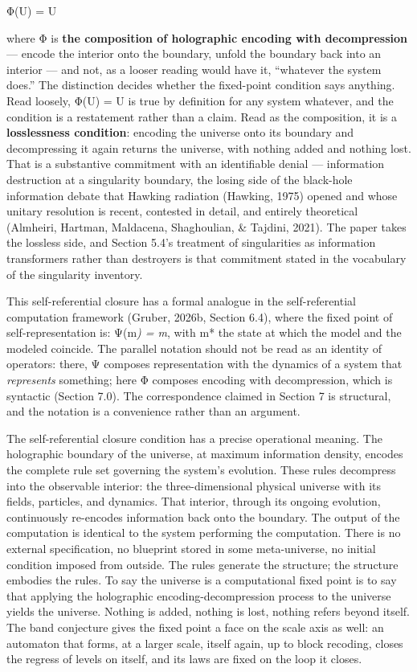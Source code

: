 \documentclass[
]{article}
\begin{document}
Φ(U) = U

where Φ is \textbf{the composition of holographic encoding with
decompression} --- encode the interior onto the boundary, unfold the
boundary back into an interior --- and not, as a looser reading would
have it, ``whatever the system does.'' The distinction decides whether
the fixed-point condition says anything. Read loosely, Φ(U) = U is true
by definition for any system whatever, and the condition is a
restatement rather than a claim. Read as the composition, it is a
\textbf{losslessness condition}: encoding the universe onto its boundary
and decompressing it again returns the universe, with nothing added and
nothing lost. That is a substantive commitment with an identifiable
denial --- information destruction at a singularity boundary, the losing
side of the black-hole information debate that Hawking radiation
(Hawking, 1975) opened and whose unitary resolution is recent, contested
in detail, and entirely theoretical (Almheiri, Hartman, Maldacena,
Shaghoulian, \& Tajdini, 2021). The paper takes the lossless side, and
Section 5.4's treatment of singularities as information transformers
rather than destroyers is that commitment stated in the vocabulary of
the singularity inventory.

This self-referential closure has a formal analogue in the
self-referential computation framework (Gruber, 2026b, Section 6.4),
where the fixed point of self-representation is: Ψ(m\emph{) = m}, with
m* the state at which the model and the modeled coincide. The parallel
notation should not be read as an identity of operators: there, Ψ
composes representation with the dynamics of a system that
\emph{represents} something; here Φ composes encoding with
decompression, which is syntactic (Section 7.0). The correspondence
claimed in Section 7 is structural, and the notation is a convenience
rather than an argument.

The self-referential closure condition has a precise operational
meaning. The holographic boundary of the universe, at maximum
information density, encodes the complete rule set governing the
system's evolution. These rules decompress into the observable interior:
the three-dimensional physical universe with its fields, particles, and
dynamics. That interior, through its ongoing evolution, continuously
re-encodes information back onto the boundary. The output of the
computation is identical to the system performing the computation. There
is no external specification, no blueprint stored in some meta-universe,
no initial condition imposed from outside. The rules generate the
structure; the structure embodies the rules. To say the universe is a
computational fixed point is to say that applying the holographic
encoding-decompression process to the universe yields the universe.
Nothing is added, nothing is lost, nothing refers beyond itself. The
band conjecture gives the fixed point a face on the scale axis as well:
an automaton that forms, at a larger scale, itself again, up to block
recoding, closes the regress of levels on itself, and its laws are fixed
on the loop it closes.
\end{document}
